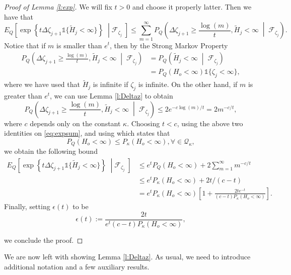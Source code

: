 \documentclass[a4paper]{amsart}
\newcommand{\hitfetak}{\widetilde{H}}
\newcommand{\Lbrace}{\left\lbrace}
\newcommand{\Rbrace}{\right\rbrace}
\begin{document}
\begin{proof}[Proof of Lemma \ref{l:exp}] We will fix $t>0$ and choose it properly latter. Then we have that
\begin{equation}\label{eq:expsum}
    E_Q \left[\exp\Lbrace t\Delta \zeta_{j+1} \mathds{1}\{\hitfetak_{j} < \infty \} \Rbrace \; \middle | \mathcal{F}_{\zeta_{j}}\; \right] \le \sum_{m=1}^\infty P_Q\left( \Delta \zeta_{j+1} \ge \frac{\log(m)}{t}, \hitfetak_{j} < \infty\; \middle | \; \mathcal{F}_{\zeta_{j}}\right).
\end{equation}
    Notice that if $m$ is smaller than $e^t$, then by the Strong Markov Property
    \begin{equation}
        \begin{split}
            P_Q\left( \Delta \zeta_{j+1} \ge \frac{\log(m)}{t}, \hitfetak_{j} < \infty\; \middle | \; \mathcal{F}_{\zeta_{j}}\right) & = P_Q\left(  \hitfetak_{j} < \infty\; \middle | \; \mathcal{F}_{\zeta_{j}}\right)\\
            & = P_Q(H_o < \infty)\mathds{1}\{\zeta_j < \infty\},
        \end{split}
    \end{equation}
    where we have used that $\hitfetak_j$ is infinite if $\zeta_j$ is infinite.
On the other hand, if $m$ is greater than $e^t$, we can use Lemma \ref{l:Deltaz} to obtain
\begin{equation}
     P_Q\left( \Delta \zeta_{j+1} \ge \frac{\log(m)}{t}, \hitfetak_{j} < \infty\; \middle | \; \mathcal{F}_{\zeta_{j}}\right) \le 2e^{-c\log(m)/t}=2m^{-c/t},
\end{equation}
where $c$ depends only on the constant $\kappa$. Choosing $t<c$, using the above two identities on \eqref{eq:expsum}, and using \cite[Lemma 1]{ribeiro2023} which states that 
$$
P_Q(H_o < \infty) \le P_\kappa(H_o < \infty), \forall \in \mathcal{Q}_\kappa,
$$ 
we obtain the following bound
\begin{equation*}
    \begin{split}
        E_Q \left[\exp\Lbrace t\Delta \zeta_{j+1} \mathds{1}\{\hitfetak_{j} < \infty \} \Rbrace \; \middle | \mathcal{F}_{\zeta_{j}}\; \right] & \le e^tP_Q(H_o < \infty) + 2\sum_{m=1}^\infty m^{-c/t}\\
        & \le e^tP_\kappa(H_o < \infty) + 2t/(c-t) \\
        & = e^tP_\kappa(H_o < \infty)\left[1+\frac{2te^{-t}}{(c-t)P_\kappa(H_o < \infty)}\right].
    \end{split}
\end{equation*}
Finally, setting $\epsilon(t)$ to be
$$
\epsilon(t) := \frac{2t}{e^{t}(c-t)P_\kappa(H_o < \infty)},
$$

we conclude the proof.
\end{proof}
We are now left with showing Lemma \ref{l:Deltaz}. As usual, we need to introduce additional notation and a few auxiliary results. 
\end{document}
